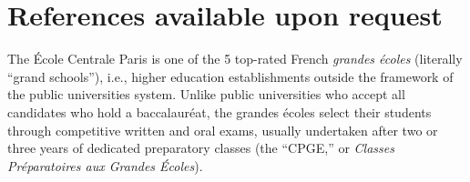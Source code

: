 \documentclass[10pt,letter]{moderncv}
\begin{document}

\section{References available upon request}

\flushleft
\footnotemark[1] \small{The \'{E}cole Centrale Paris is one of the 5 top-rated French \textit{grandes écoles} (literally ``grand schools''), i.e., higher education establishments outside the framework of the public universities system. Unlike public universities who accept all candidates who hold a baccalauréat, the grandes écoles select their students through competitive written and oral exams, usually undertaken after two or three years of dedicated preparatory classes (the ``CPGE,'' or \textit{Classes Préparatoires aux Grandes Écoles})}.

%
\end{document}
